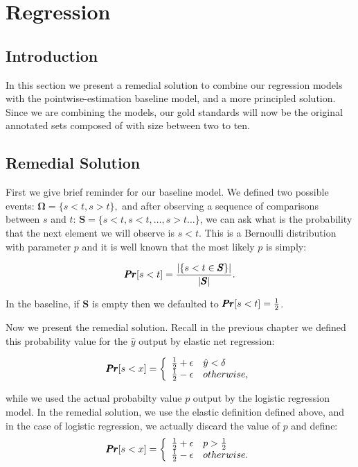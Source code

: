 \section{Regression}

\subsection{Introduction}

In this section we present a remedial solution to combine our regression models with the pointwise-estimation baseline model, and a more principled solution. Since we are combining the models, our gold standards will now be the original annotated sets composed of with size between two to ten.

\subsection{Remedial Solution}

First we give brief reminder for our baseline model. We defined two possible events: $\pmb{\Omega} = \{s < t, s > t\},$ and after observing a sequence of comparisons between $s$ and $t$: $\pmb{S} = \{ s < t, s < t, \ldots, s > t \ldots \}$, we can ask what is the probability that the next element we will observe is $s < t$. This is a Bernoulli distribution with parameter $p$ and it is well known that the most likely $p$ is simply:

\begin{equation*}
	\pmb{Pr}[ s < t ] = \frac{|\{ s < t \in \pmb{S} \}|}{|\pmb{S}|}.
\end{equation*}

In the baseline, if $\pmb{S}$ is empty then we defaulted to $\pmb{Pr}[ s < t ] = \frac{1}{2}$. 

Now we present the remedial solution. Recall in the previous chapter we defined this probability value for the $\hat{y}$ output by elastic net regression:

\[   
\pmb{Pr}[s < x ] = \left\{
\begin{array}{ll}
      \frac{1}{2} + \epsilon & \hat{y} < \delta \\
      \frac{1}{2} - \epsilon & otherwise,
\end{array} 
\right.
\]

while we used the actual probabilty value $p$ output by the logistic regression model. In the remedial solution, we use the elastic definition defined above, and in the case of logistic regression, we actually discard the value of $p$ and define:
\[   
\pmb{Pr}[s < x ] = \left\{
\begin{array}{ll}
      \frac{1}{2} + \epsilon & p > \frac{1}{2} \\
      \frac{1}{2} - \epsilon & otherwise.
\end{array} 
\right.
\]

